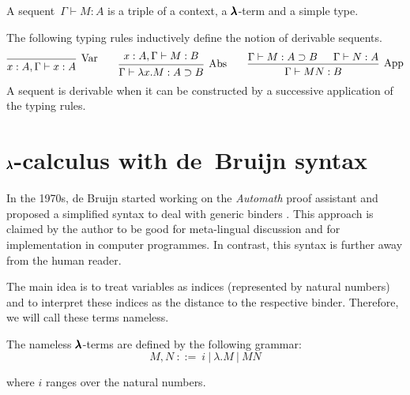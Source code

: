\begin{definition}[Sequent]
  A sequent~$\Gamma \vdash M:A$ is a triple of a context, a $\pmb{\lambda}$-term and a simple type.
\end{definition}

\begin{definition}
  \label{typing_rules}
  The following typing rules inductively define the notion of derivable sequents.
  \[
    \begin{prooftree}
      \infer0[Var]{ x:A, \Gamma \vdash x:A } 
    \end{prooftree}
    \qquad
    \begin{prooftree}
      \hypo{ x:A, \Gamma \vdash M:B }
      \infer1[Abs]{ \Gamma \vdash \lambda x . M : A \supset B  } 
    \end{prooftree}
    \qquad
    \begin{prooftree}
      \hypo{ \Gamma \vdash M : A \supset B }
      \hypo{ \Gamma \vdash N : A }	
      \infer2[App]{ \Gamma \vdash M N : B } 
    \end{prooftree}
  \]
  A sequent is derivable when it can be constructed by a successive application of the typing rules.  
\end{definition}


\section{$\pmb{\lambda}$-calculus with de~Bruijn syntax}

In the 1970s, de Bruijn started working on the \textit{Automath} proof assistant and proposed a simplified syntax to deal with generic binders \cite{deBruijn}.
This approach is claimed by the author to be good for meta-lingual discussion and for implementation in computer programmes.
In contrast, this syntax is further away from the human reader.

The main idea is to treat variables as indices (represented by natural numbers) and to interpret these indices as the distance to the respective binder.
Therefore, we will call these terms nameless. 

\begin{definition}
  The nameless $\pmb{\lambda}$-terms are defined by the following grammar:
  \[ M, N \ ::= \ i \ | \ \lambda . M \ | \ M N \]
  
  where $i$ ranges over the natural numbers.
\end{definition}

